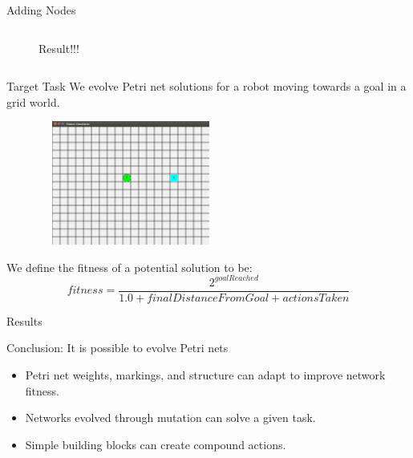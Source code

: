 \documentclass[12pt]{beamer}
\begin{document}
\begin{frame}{Adding Nodes}
\begin{columns}[]
\begin{column}{2in}
 \begin{figure}
\caption{Result!!!}
\end{figure}
  \end{column}
\end{columns}
\end{frame}

\begin{frame}{Target Task}
We evolve Petri net solutions for a robot moving towards a goal in a grid world.
\begin{figure}
\includegraphics[trim = 80mm 80mm 20mm 70mm, clip, width = 2.4in, height = 1.6in]{robot_sim.png}
\end{figure}
We define the fitness of a potential solution to be:
$$fitness = \frac{2^{goalReached}}{1.0 + finalDistanceFromGoal + actionsTaken}$$
\end{frame}

\begin{frame}{Results}

Conclusion: It is possible to evolve Petri nets
\begin{itemize}
\item Petri net weights, markings, and structure can adapt to improve network fitness.
\item Networks evolved through mutation can solve a given task.
\item Simple building blocks can create compound actions.
\end{itemize}
\end{frame}
\end{document}
